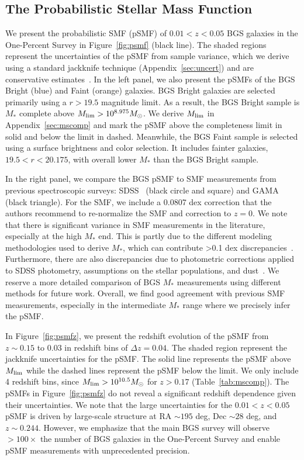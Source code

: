 \subsection{The Probabilistic Stellar Mass Function} \label{sec:psmf}
We present the probabilistic SMF (pSMF) of $0.01 < z < 0.05$ BGS galaxies in the
One-Percent Survey in Figure~\ref{fig:psmf} (black line). 
The shaded regions represent the uncertainties of the pSMF from sample variance,
which we derive using a standard jackknife technique
(Appendix~\ref{sec:uncert}) and are conservative estimates~\citep{norberg2009}. 
In the left panel, we also present the pSMFs of the BGS Bright (blue) and Faint
(orange) galaxies.  
BGS Bright galaxies are selected primarily using a $r > 19.5$ magnitude limit. 
As a result, the BGS Bright sample is $M_*$ complete above $M_{\rm lim} >
10^{8.975}M_\odot$. 
We derive $M_{\rm lim}$ in Appendix~\ref{sec:mscomp} and mark the pSMF above
the completeness limit in solid and below the limit in dashed. 
Meanwhile, the BGS Faint sample is selected using a surface brightness and
color selection.   
It includes fainter galaxies, $19.5 < r < 20.175$, with overall lower $M_*$
than the BGS Bright sample. 

In the right panel, we compare the BGS pSMF to SMF measurements from previous 
spectroscopic surveys: SDSS~\citep{moustakas2013, bernardi2017} (black circle
and square) and GAMA~\citep{driver2022} (black triangle).
For the \cite{driver2022} SMF, we include a 0.0807 dex correction that the
authors recommend to re-normalize the SMF and correction to $z=0$. 
We note that there is significant variance in SMF measurements in the
literature, especially at the high $M_*$ end. 
This is partly due to the different modeling methodologies used to derive
$M_*$, which can contribute >0.1 dex discrepancies~\citep{pacifici2023}. 
Furthermore, there are also discrepancies due to photometric corrections
applied to SDSS photometry, assumptions on the stellar populations, and
dust~\citep{bernardi2017}.
We reserve a more detailed comparison of BGS $M_*$ measurements using different
methods for future work. 
Overall, we find good agreement with previous SMF measurements, especially in
the intermediate $M_*$ range where we precisely infer the pSMF.  

In Figure~\ref{fig:psmfz}, we present the redshift evolution of the pSMF from
$z\sim 0.15$ to 0.03 in redshift bins of $\Delta z = 0.04$. 
The shaded region represent the jackknife uncertainties for the pSMF.
The solid line represents the pSMF above $M_{\rm lim}$ while the dashed lines
represent the pSMF below the limit. 
We only include 4 redshift bins, since $M_{\rm lim} > 10^{10.5}M_\odot$ for 
$z > 0.17$ (Table~\ref{tab:mscomp}).
The pSMFs in Figure~\ref{fig:psmfz} do not reveal a significant redshift
dependence given their uncertainties. 
We note that the large uncertainties for the $0.01 < z < 0.05$ pSMF is driven
by large-scale structure at RA $\sim 195$ deg, Dec $\sim 28$ deg, and 
$z\sim0.244$. 
However, we emphasize that the main BGS survey will observe $>100\times$ the
number of BGS galaxies in the One-Percent Survey and enable pSMF measurements
with unprecedented precision. 

